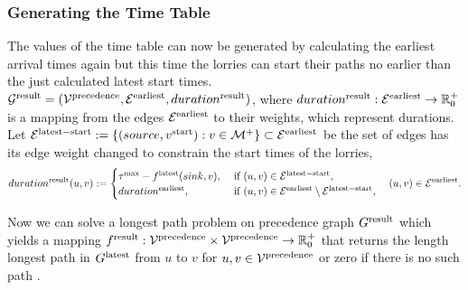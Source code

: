 
\subsubsection{Generating the Time Table}

The values of the time table can now be generated by calculating the earliest arrival times again but this time the lorries can start their paths no earlier than the just calculated latest start times.\\

$\mathcal G^{\rm result} = (\mathcal V^{\rm precedence}, \mathcal E^{\rm earliest} , duration^{\rm result})$, where
$duration^{\rm result}:\mathcal E^{\rm earliest} \rightarrow \mathbb R^+_0$
is a mapping from
the edges  $\mathcal E^{\rm earliest}$ to their weights, which represent durations. \\

Let
$\mathcal E^{\rm latest-start} := \{(source,v^{\rm start}) : v \in \mathcal M^{+ } \} \subset \mathcal E^{\rm earliest}$
be the set of edges has its edge weight changed to constrain the start times of the lorries,
\begin{align}
  duration^{\rm result}(u,v) :=
  \begin{cases}
    \tau^{\rm max} - f^{\rm latest}(sink,v)     ,
    & \text{ if }   (u,v) \in \mathcal E^{\rm latest-start},  \\
    duration^{\rm earliest}      ,
    & \text{ if }   (u,v) \in \mathcal E^{\rm earliest} \setminus \mathcal E^{\rm latest-start},
  \end{cases}
  \quad(u,v) \in \mathcal E^{\rm earliest}. \notag
\end{align}


Now we can solve a  longest path problem on precedence graph
$G^{\rm result}$
which yields a mapping
$f^{\rm result}: \mathcal V^{\rm precedence} \times \mathcal V^{\rm precedence} \rightarrow \mathbb{R}^+_0$
that returns the length longest path in $G^{\rm latest}$ from $u$ to $v$ for  $u,v \in \mathcal V^{\rm precedence}$ or zero if there is no such path .\\


